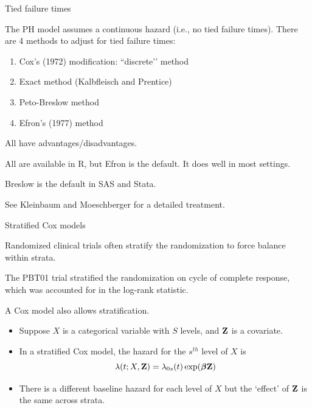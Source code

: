 \documentclass[ignorenonframetext,]{beamer}
\providecommand{\tightlist}{%
  \setlength{\itemsep}{0pt}\setlength{\parskip}{0pt}}
\newcommand{\R}{\textsf{R}}
\newcommand{\bbeta}{\mbox{\boldmath$\beta$}}
\begin{document}
\begin{frame}{%
\protect\hypertarget{tied-failure-times}{%
Tied failure times}}

The PH model assumes a continuous hazard (i.e., no tied failure times).
There are 4 methods to adjust for tied failure times:

\begin{enumerate}
[1.]
\tightlist
\item
  Cox’s (1972) modification: ``discrete’’ method\\
\item
  Exact method (Kalbfleisch and Prentice)\\
\item
  Peto-Breslow method
\item
  Efron’s (1977) method
\end{enumerate}

All have advantages/disadvantages.

All are available in \R, but Efron is the default. It does well in most
settings.

Breslow is the default in SAS and Stata.

See Kleinbaum and Moeschberger for a detailed treatment.

\end{frame}

\begin{frame}{%
\protect\hypertarget{stratified-cox-models}{%
Stratified Cox models}}

Randomized clinical trials often stratify the randomization to force
balance within strata.

The PBT01 trial stratified the randomization on cycle of complete
response, which was accounted for in the log-rank statistic.

A Cox model also allows stratification.

\begin{itemize}
\item
  Suppose \(X\) is a categorical variable with \(S\) levels, and
  \({\bf Z}\) is a covariate.
\item
  In a stratified Cox model, the hazard for the \(s^{th}\) level of
  \(X\) is
  \[\lambda(t;X, {\bf Z}) = \lambda_{0s}(t) \exp(\bbeta {\bf Z})\]
\item
  There is a different baseline hazard for each level of \(X\) but the
  `effect’ of \({\bf Z}\) is the same across strata.
\end{itemize}

\end{frame}
\end{document}
